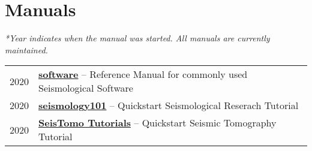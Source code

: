 \section*{Manuals}

\textit{*Year indicates when the manual was started. All manuals are currently maintained.}

\begin{tabular}{p{} p{}}
2020 &	\textbf{\href{https://seismo-learn.org/software/}{software}} -- Reference Manual for commonly used Seismological Software \\
2020 &	\textbf{\href{https://seismo-learn.org/seismology101/}{seismology101}} -- Quickstart Seismological Reserach Tutorial \\
2020 &  \textbf{\href{https://migg-ntu.github.io/SeisTomo_Tutorials/}{SeisTomo Tutorials}} -- Quickstart Seismic Tomography Tutorial \\
\end{tabular}
